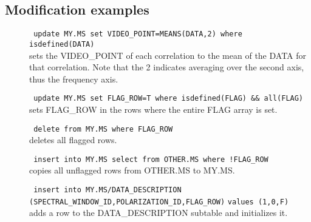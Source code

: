\subsection{Modification examples}
\begin{description}
  \item[] \texttt{ update MY.MS set VIDEO\_POINT=MEANS(DATA,2)
                   where isdefined(DATA) }
      \\sets the VIDEO\_POINT of each correlation to the mean of the
      DATA for that correlation. Note that the 2 indicates averaging over
      the second axis, thus the frequency axis.

  \item[] \texttt{ update MY.MS set FLAG\_ROW=T where isdefined(FLAG) \&\& all(FLAG)}
      \\sets FLAG\_ROW in the rows where the entire FLAG array is set.

  \item[] \texttt{ delete from MY.MS where FLAG\_ROW}
      \\deletes all flagged rows.

  \item[] \texttt{ insert into MY.MS select from OTHER.MS where !FLAG\_ROW}
      \\copies all unflagged rows from OTHER.MS to MY.MS.

  \item[] \texttt{ insert into MY.MS/DATA\_DESCRIPTION}
          \texttt{(SPECTRAL\_WINDOW\_ID,POLARIZATION\_ID,FLAG\_ROW)}
          \texttt{values (1,0,F)}
      \\adds a row to the DATA\_DESCRIPTION subtable and initializes it.
                   
\end{description}


